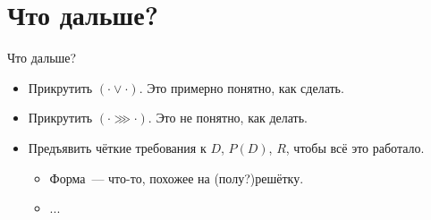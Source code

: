 \section{Что дальше?}

\begin{frame}{Что дальше?}
  \begin{itemize}
  \item Прикрутить $(\cdot \vee \cdot)$. Это примерно понятно, как
    сделать.
  \item Прикрутить $(\cdot \ggg \cdot)$. Это не понятно, как делать.
  \item Предъявить чёткие требования к $D$, $P(D)$, $R$, чтобы всё это
    работало.
    \begin{itemize}
    \item Форма~--- что-то, похожее на (полу?)решётку.
    \item ...
    \end{itemize}
  \end{itemize}
\end{frame}